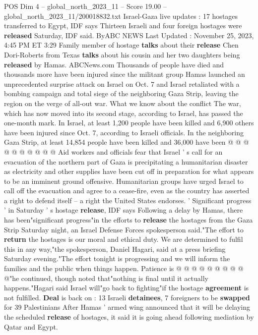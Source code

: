 \begin{textsample}{POS Dim 4 – global\_north\_2023\_11 – Score 19.00 – global\_north\_2023\_11/200018832.txt}  \label{ex:f4_pos_276}
Israel-Gaza live updates : 17 hostages transferred to Egypt, IDF says Thirteen Israeli and four foreign hostages were \textbf{released} Saturday, IDF said.
ByABC NEWS Last Updated : November 25, 2023, 4:45 PM ET 3:29 Family member of hostage \textbf{talks} about their \textbf{release} Chen Dori-Roberts from Texas \textbf{talks} about his cousin and her two daughters being \textbf{released} by Hamas.
ABCNews.com Thousands of people have died and thousands more have been injured since the militant group Hamas launched an unprecedented surprise attack on Israel on Oct. 7 and Israel retaliated with a bombing campaign and total siege of the neighboring Gaza Strip, leaving the region on the verge of all-out war.
What we know about the conflict The war, which has now moved into its second stage, according to Israel, has passed the one-month mark.
In Israel, at least 1,200 people have been killed and 6,900 others have been injured since Oct. 7, according to Israeli officials.
In the neighboring Gaza Strip, at least 14,854 people have been killed and 36,000 have been @ @ @ @ @ @ @ @ @ @ Aid workers and officials fear that Israel ' s call for an evacuation of the northern part of Gaza is precipitating a humanitarian disaster as electricity and other supplies have been cut off in preparation for what appears to be an imminent ground offensive.
Humanitarian groups have urged Israel to call off the evacuation and agree to a cease-fire, even as the country has asserted a right to defend itself -- a right the United States endorses. ' Significant progress ' in Saturday ' s hostage \textbf{release}, IDF says Following a delay by Hamas, there has been"significant progress"in the efforts to \textbf{release} the hostages from the Gaza Strip Saturday night, an Israel Defense Forces spokesperson said."The effort to \textbf{return} the hostages is our moral and ethical duty.
We are determined to fulfil this in any way,"the spokesperson, Daniel Hagari, said at a press briefing Saturday evening."The effort tonight is progressing and we will inform the families and the public when things happen.
Patience is @ @ @ @ @ @ @ @ @ @"he continued, though noted that"nothing is final until it actually happens."Hagari said Israel will"go back to fighting"if the hostage \textbf{agreement} is not fulfilled. \textbf{Deal} is back on : 13 Israeli \textbf{detainees}, 7 foreigners to be \textbf{swapped} for 39 Palestinians After Hamas ' armed wing announced that it will be delaying the scheduled \textbf{release} of hostages, it said it is going ahead following mediation by Qatar and Egypt.

\end{textsample}
